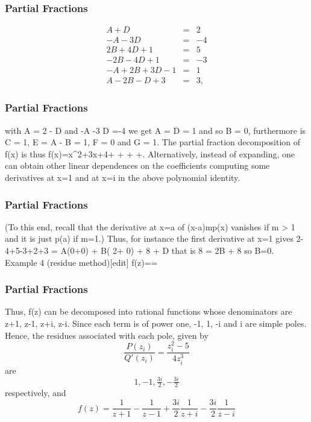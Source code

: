 \begin{frame}
\frametitle{Partial Fractions}

\begin{align}
 A + D &=& 2  \\
 -A - 3D &=&  -4 \\
2B + 4D + 1 &=& 5 \\
-2B - 4D + 1 &=& -3 \\
-A + 2B + 3D - 1 &=& 1 \\
A - 2B - D + 3 &=& 3 ,
\end{align}
\end{frame}
\begin{frame}
\frametitle{Partial Fractions}
with A = 2 - D and -A -3 D =-4 we get A = D = 1 and so B = 0, furthermore is C = 1, E = A - B = 1, F = 0 and G = 1.
The partial fraction decomposition of ƒ(x) is thus
f(x)=x^2+3x+4+ +  + +.
Alternatively, instead of expanding, one can obtain other linear dependences on the coefficients computing 
some derivatives at x=1 and at x=i in the above polynomial identity. 
\end{frame}
\begin{frame}
\frametitle{Partial Fractions}
(To this end, recall that the derivative at x=a of (x-a)mp(x) vanishes if m > 1 and it is just p(a) if m=1.) Thus, for instance the first derivative at x=1 gives
 2-4+5-3+2+3   = A\cdot(0+0) + B\cdot( 2+ 0) + 8 + D 
that is 8 = 2B + 8 so B=0.
Example 4 (residue method)[edit]
 f(z)==
\end{frame}
\begin{frame}
\frametitle{Partial Fractions}
Thus, f(z) can be decomposed into rational functions whose denominators are z+1, z-1, z+i, z-i. Since each term is of power one, -1, 1, -i and i are simple poles.
Hence, the residues associated with each pole, given by
\[
\frac{P(z_i)}{Q'(z_i)} = \frac{z_i^2 - 5}{4z_i^3}\]
are
\[ 1, -1, \tfrac{3i}{2}, -\tfrac{3i}{2}\]
respectively, and
\[ f(z)=\frac{1}{z+1}-\frac{1}{z-1}+\frac{3i}{2}\frac{1}{z+i}-\frac{3i}{2}\frac{1}{z-i}\]

\end{frame}
